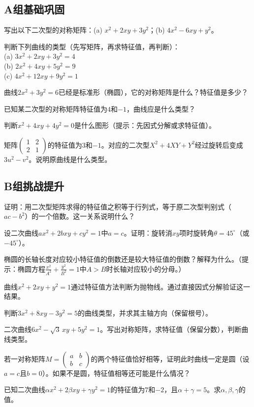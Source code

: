 \subsection*{A组\quad 基础巩固}
\begin{exercise}
\item 写出以下二次型的对称矩阵：(a) $x^2+2xy+3y^2$；(b) $4x^2-6xy+y^2$。
\item 判断下列曲线的类型（先写矩阵，再求特征值，再判断）：\\
(a) $3x^2+2xy+3y^2=4$\\
(b) $2x^2+4xy+5y^2=9$\\
(c) $4x^2+12xy+9y^2=1$
\item 曲线$2x^2+3y^2=6$已经是标准形（椭圆），它的对称矩阵是什么？特征值是多少？
\item 已知某二次型的对称矩阵特征值为$4$和$-1$，曲线应是什么类型？
\item 判断$x^2+4xy+4y^2=0$是什么图形（提示：先因式分解或求特征值）。
\item 矩阵$\begin{pmatrix}1&2\\2&1\end{pmatrix}$的特征值为$3$和$-1$。对应的二次型$X^2+4XY+Y^2$经过旋转后变成$3u^2-v^2$。说明原曲线是什么类型。
\end{exercise}

\subsection*{B组\quad 挑战提升}
\begin{exercise}
\item 证明：用二次型矩阵求得的特征值之积等于行列式，等于原二次型判别式（$ac-b^2$）的一个倍数。这一关系说明什么？
\item 设二次曲线$ax^2+2bxy+cy^2=1$中$a=c$。证明：旋转消$xy$项时旋转角$\theta=45^\circ$（或$-45^\circ$）。
\item 椭圆的长轴长度对应较小特征值的倒数还是较大特征值的倒数？解释为什么。（提示：椭圆方程$\frac{x^2}{A^2}+\frac{y^2}{B^2}=1$中$A>B$时长轴对应较小的分母。）
\item 曲线$x^2+2xy+y^2=1$通过特征值方法判断为抛物线。通过直接因式分解验证这一结果。
\item 判断$3x^2+8xy-3y^2=5$的曲线类型，并求其主轴方向（保留根号）。
\item 二次曲线$6x^2-\sqrt{3}\,xy+5y^2=1$。写出对称矩阵，求特征值（保留分数），判断曲线类型。
\item 若一对称矩阵$M=\begin{pmatrix}a&b\\b&c\end{pmatrix}$的两个特征值恰好相等，证明此时曲线一定是圆（设$a=c$且$b=0$）。如果不是圆，特征值相等还可能是什么情况？
\item 已知二次曲线$\alpha x^2+2\beta xy+\gamma y^2=1$的特征值为$7$和$-2$，且$\alpha+\gamma=5$。求$\alpha,\beta,\gamma$的值。
\end{exercise}

\newpage
